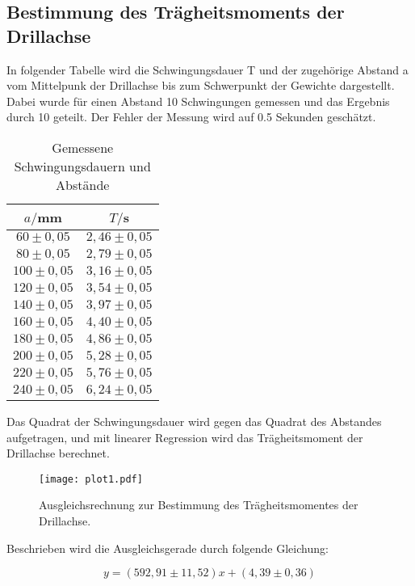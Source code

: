 \subsection{Bestimmung des Trägheitsmoments der Drillachse}
In folgender Tabelle wird die Schwingungsdauer T und der zugehörige Abstand a vom Mittelpunk der Drillachse bis 
zum Schwerpunkt der Gewichte dargestellt. Dabei wurde für einen Abstand 10 Schwingungen gemessen und das Ergebnis
durch 10 geteilt. Der Fehler der Messung wird auf 0.5 Sekunden geschätzt.


\begin{table}[H]
  \centering
  \caption{Gemessene Schwingungsdauern und Abstände}
  \label{tab:Gemessene Schwingungsdauern und Abstände}
  \begin{tabular}{c c}
    \toprule
    $a/$mm & $T/$s \\
    \midrule
     $60 \pm 0,05$ & $2,46 \pm 0,05$ \\ 
     $80 \pm 0,05$ & $2,79 \pm 0,05$ \\
    $100 \pm 0,05$ & $3,16 \pm 0,05$ \\
    $120 \pm 0,05$ & $3,54 \pm 0,05$ \\
    $140 \pm 0,05$ & $3,97 \pm 0,05$ \\
    $160 \pm 0,05$ & $4,40 \pm 0,05$ \\
    $180 \pm 0,05$ & $4,86 \pm 0,05$ \\
    $200 \pm 0,05$ & $5,28 \pm 0,05$ \\
    $220 \pm 0,05$ & $5,76 \pm 0,05$ \\
    $240 \pm 0,05$ & $6,24 \pm 0,05$ \\
    \bottomrule
  \end{tabular}
\end{table} 


Das Quadrat der Schwingungsdauer wird gegen das Quadrat des Abstandes aufgetragen, und mit linearer Regression wird das Trägheitsmoment
der Drillachse berechnet. 

\begin{figure}[H]
  \centering
  \texttt{[image: plot1.pdf]}
  \caption{Ausgleichsrechnung zur Bestimmung des Trägheitsmomentes der Drillachse.}
  \label{fig:plot}
\end{figure}

Beschrieben wird die Ausgleichsgerade durch folgende Gleichung:

\begin{equation}
  y = (592,91 \pm 11,52)x + (4,39 \pm 0,36)
\end{equation}

